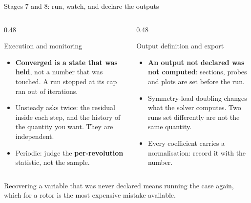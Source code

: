 \begin{frame}{Stages 7 and 8: run, watch, and declare the outputs}
\begin{columns}[T]
\begin{column}{0.48\textwidth}
\begin{block}{Execution and monitoring}
\begin{itemize}\small
  \item \textbf{Converged is a state that was held}, not a number that was
        touched. A run stopped at its cap ran out of iterations.
  \item Unsteady asks twice: the residual inside each step, and the history
        of the quantity you want. They are independent.
  \item Periodic: judge the \textbf{per-revolution} statistic, not the
        sample.
\end{itemize}
\end{block}
\end{column}
\begin{column}{0.48\textwidth}
\begin{block}{Output definition and export}
\begin{itemize}\small
  \item \textbf{An output not declared was not computed}: sections, probes
        and plots are set before the run.
  \item Symmetry-load doubling changes what the solver computes. Two runs set
        differently are not the same quantity.
  \item Every coefficient carries a normalisation: record it with the number.
\end{itemize}
\end{block}
\end{column}
\end{columns}
\begin{takeaway}Recovering a variable that was never declared means running
the case again, which for a rotor is the most expensive mistake
available.\end{takeaway}
\end{frame}

